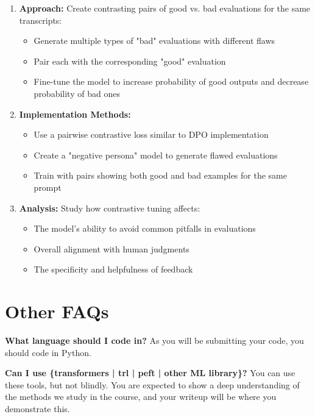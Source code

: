 \documentclass[11pt]{article}
\begin{document}
\begin{enumerate}
    \item \textbf{Approach:} Create contrasting pairs of good vs. bad evaluations for the same transcripts:
    \begin{itemize}
        \item Generate multiple types of "bad" evaluations with different flaws
        \item Pair each with the corresponding "good" evaluation
        \item Fine-tune the model to increase probability of good outputs and decrease probability of bad ones
    \end{itemize}
    
    \item \textbf{Implementation Methods:}
    \begin{itemize}
        \item Use a pairwise contrastive loss similar to DPO implementation
        \item Create a "negative persona" model to generate flawed evaluations
        \item Train with pairs showing both good and bad examples for the same prompt
    \end{itemize}
    
    \item \textbf{Analysis:} Study how contrastive tuning affects:
    \begin{itemize}
        \item The model's ability to avoid common pitfalls in evaluations
        \item Overall alignment with human judgments
        \item The specificity and helpfulness of feedback
    \end{itemize}
\end{enumerate}

\section{Other FAQs}

\textbf{What language should I code in?} As you will be submitting your code, you should code in Python.

\textbf{Can I use \{transformers | trl | peft | other ML library\}?} You can use these tools, but not blindly. You are expected to show a deep understanding of the methods we study in the course, and your writeup will be where you demonstrate this.
\end{document}
